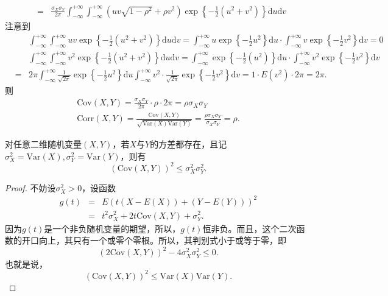 \begin{solution}
\begin{eqnarray*}
&=& \frac{\sigma_{X} \sigma_{Y}}{2 \pi} \int_{-\infty}^{+\infty} \int_{-\infty}^{+\infty}\left(u v \sqrt{1-\rho^{2}}+\rho v^{2}\right) \exp \left\{-\frac{1}{2}\left(u^{2}+v^{2}\right)\right\} \text{d} u \text{d} v
\end{eqnarray*}
注意到\begin{eqnarray*}
&&\int_{-\infty}^{+\infty} \int_{-\infty}^{+\infty} u v \exp \left\{-\frac{1}{2}\left(u^{2}+v^{2}\right)\right\} \text{d} u \text{d} v=\int_{-\infty}^{+\infty} u \exp \left\{-\frac{1}{2} u^{2}\right\} \text{d} u \cdot \int_{-\infty}^{+\infty} v \exp \left\{-\frac{1}{2} v^{2}\right\} \text{d} v=0 \\
&&\int_{-\infty}^{+\infty} \int_{-\infty}^{+\infty} v^{2} \exp \left\{-\frac{1}{2}\left(u^{2}+v^{2}\right)\right\} \text{d} u \text{d} v=\int_{-\infty}^{+\infty} \exp \left\{-\frac{1}{2}\left(u^{2}\right)\right\} \text{d} u \cdot \int_{-\infty}^{+\infty} v^{2} \exp \left\{-\frac{1}{2} v^{2}\right\} \text{d} v \\
&=&2 \pi \int_{-\infty}^{+\infty} \frac{1}{\sqrt{2 \pi}} \exp \left\{-\frac{1}{2} u^{2}\right\} \text{d} u \int_{-\infty}^{+\infty} v^{2} \cdot \frac{1}{\sqrt{2 \pi}} \exp \left\{-\frac{1}{2} v^{2}\right\} \text{d} v=1 \cdot E\left(v^{2}\right) \cdot 2 \pi=2 \pi .
\end{eqnarray*}
则\begin{eqnarray*}
\text{Cov}(X, Y)=\frac{\sigma_{X} \sigma_{Y}}{2 \pi} \cdot \rho \cdot 2 \pi=\rho \sigma_{X} \sigma_{Y} \\
\text{Corr}(X, Y)=\frac{\text{Cov}(X ,Y)}{\sqrt{\text{Var}(X) \text{Var}(Y)}}=\frac{\rho \sigma_{X} \sigma_{Y}}{\sigma_{X} \sigma_{Y}}=\rho.
\end{eqnarray*}
\end{solution}


\begin{theorem}[Schwarz不等式]
对任意二维随机变量$(X,Y)$，若$X$与$Y$的方差都存在，且记$\sigma_{X}^{2}=\text{Var}(X),\sigma_{Y}^{2}=\text{Var}(Y)$，则有$$(\text{Cov}(X, Y))^{2} \leq \sigma_{X}^{2} \sigma_{Y}^{2}.$$
\end{theorem}
\begin{proof}
    不妨设$\sigma_{X}^{2}>0$，设函数\begin{eqnarray*}
       g(t) &=&E(t(X-E(X))+(Y-E(Y)))^{2}  \\
&=&t^{2} \sigma_{X}^{2}+2t\text{Cov}\left(X, Y\right)+\sigma_{Y}^{2}.
    \end{eqnarray*}
因为$g(t)$是一个非负随机变量的期望，所以，$g(t)$恒非负。而且，这个二次函数的开口向上，其只有一个或零个零根。所以，其判别式小于或等于零，即$$ {(2 \text{Cov}(X, Y))^{2}-4 \sigma_{X}^{2} \sigma_{Y}^{2} \leqslant 0}. $$
也就是说，
$$(\text{Cov}(X, Y))^{2} \leqslant \text{Var}(X) \text{Var}(Y).$$
\end{proof}


